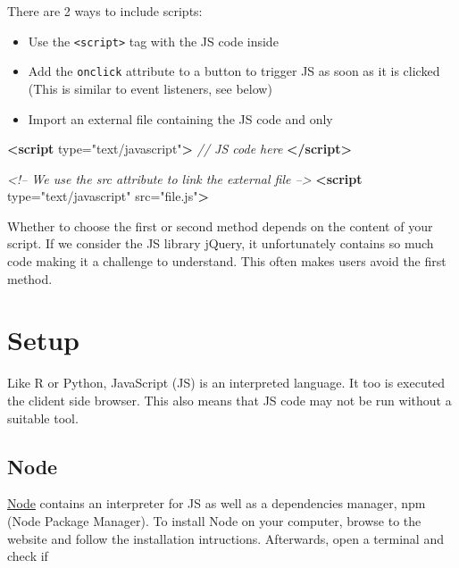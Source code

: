 \documentclass[]{book}
\newenvironment{Shaded}{\begin{snugshade}}{\end{snugshade}}
\newcommand{\CommentTok}[1]{\textcolor[rgb]{0.56,0.35,0.01}{\textit{#1}}}
\newcommand{\KeywordTok}[1]{\textcolor[rgb]{0.13,0.29,0.53}{\textbf{#1}}}
\newcommand{\OtherTok}[1]{\textcolor[rgb]{0.56,0.35,0.01}{#1}}
\newcommand{\StringTok}[1]{\textcolor[rgb]{0.31,0.60,0.02}{#1}}
\providecommand{\tightlist}{%
  \setlength{\itemsep}{0pt}\setlength{\parskip}{0pt}}
\begin{document}
There are 2 ways to include scripts:

\begin{itemize}
\tightlist
\item
  Use the \texttt{\textless{}script\textgreater{}} tag with the JS code inside
\item
  Add the \texttt{onclick} attribute to a button to trigger JS as soon as it is clicked (This is similar to event listeners, see below)
\item
  Import an external file containing the JS code and only
\end{itemize}

\begin{Shaded}
\begin{Highlighting}[]
\KeywordTok{<script}\OtherTok{ type=}\StringTok{"text/javascript"}\KeywordTok{>}
\CommentTok{// JS code here}
\KeywordTok{</script>}
\end{Highlighting}
\end{Shaded}

\begin{Shaded}
\begin{Highlighting}[]
\CommentTok{<!-- We use the src attribute to link the external file -->}
\KeywordTok{<script}\OtherTok{ type=}\StringTok{"text/javascript"}\OtherTok{ src=}\StringTok{"file.js"}\KeywordTok{>}
\end{Highlighting}
\end{Shaded}

Whether to choose the first or second method depends on the content of your script. If we consider the JS library jQuery, it unfortunately contains so much code making it a challenge to understand. This often makes users avoid the first method.

\hypertarget{setup}{%
\section{Setup}\label{setup}}

Like R or Python, JavaScript (JS) is an interpreted language. It too is executed the clident side browser. This also means that JS code may not be run without a suitable tool.

\hypertarget{node}{%
\subsection{Node}\label{node}}

\href{https://nodejs.org/en/}{Node} contains an interpreter for JS as well as a dependencies manager, npm (Node Package Manager). To install Node on your computer, browse to the website and follow the installation intructions. Afterwards, open a terminal and check if
\end{document}
